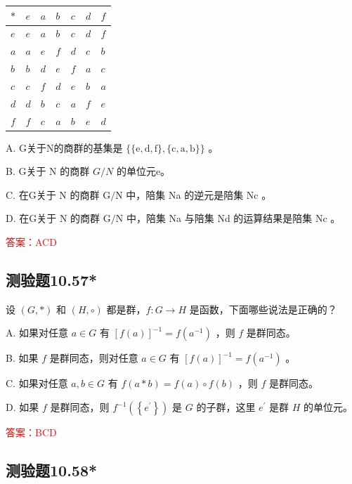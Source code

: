 \documentclass[UTF8, heading=true]{ctexart}
\begin{document}
\begin{table}[H]
  \renewcommand{\arraystretch}{1.5}
  \centering
\begin{tabular}{l|llllll}
\hline$*$ & $e$ & $a$ & $b$ & $c$ & $d$ & $f$ \\
\hline$e$ & $e$ & $a$ & $b$ & $c$ & $d$ & $f$ \\
$a$ & $a$ & $e$ & $f$ & $d$ & $c$ & $b$ \\
$b$ & $b$ & $d$ & $e$ & $f$ & $a$ & $c$ \\
$c$ & $c$ & $f$ & $d$ & $e$ & $b$ & $a$ \\
$d$ & $d$ & $b$ & $c$ & $a$ & $f$ & $e$ \\
$f$ & $f$ & $c$ & $a$ & $b$ & $e$ & $d$ \\
\hline
\end{tabular}
\end{table}

A. G关于N的商群的基集是 $\{\{\mathrm{e}, \mathrm{d}, \mathrm{f}\},\{\mathrm{c}, \mathrm{a}, \mathrm{b}\}\}$ 。

B. G关于 N 的商群 $G / N$ 的单位元e。

C. 在G关于 N 的商群 $\mathrm{G} / \mathrm{N}$ 中，陪集 Na 的逆元是陪集 Nc 。

D. 在G关于 N 的商群 $\mathrm{G} / \mathrm{N}$ 中，陪集 Na 与陪集 Nd 的运算结果是陪集 Nc 。

\textcolor{red}{答案：ACD}


\subsection{测验题10.57*}

设 $(G, *)$ 和 $(H, \circ)$ 都是群，$f: G \rightarrow H$ 是函数，下面哪些说法是正确的？

A. 如果对任意 $a \in G$ 有 $[f(a)]^{-1}=f\left(a^{-1}\right)$ ，则 $f$ 是群同态。

B. 如果 $f$ 是群同态，则对任意 $a \in G$ 有 $[f(a)]^{-1}=f\left(a^{-1}\right)$ 。

C. 如果对任意 $a, b \in G$ 有 $f(a * b)=f(a) \circ f(b)$ ，则 $f$ 是群同态。

D. 如果 $f$ 是群同态，则 $f^{-1}\left(\left\{e^{\prime}\right\}\right)$ 是 $G$ 的子群，这里 $e^{\prime}$ 是群 $H$ 的单位元。

\textcolor{red}{答案：BCD}

\subsection{测验题10.58*}
\end{document}
